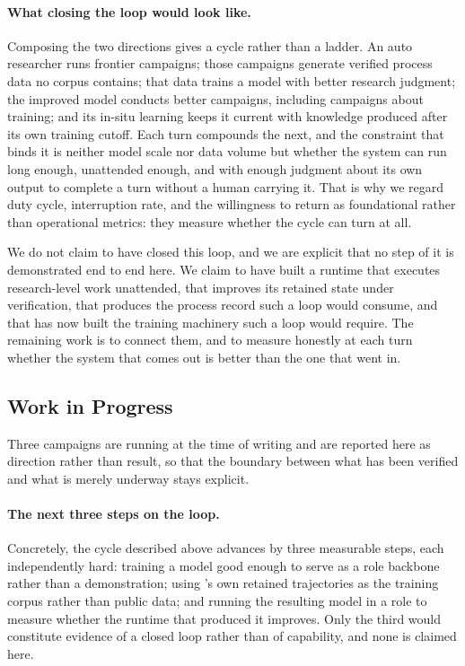 \paragraph{What closing the loop would look like.}
Composing the two directions gives a cycle rather than a ladder. An auto researcher
runs frontier campaigns; those campaigns generate verified process data no corpus
contains; that data trains a model with better research judgment; the improved model
conducts better campaigns, including campaigns about training; and its in-situ
learning keeps it current with knowledge produced after its own training cutoff. Each
turn compounds the next, and the constraint that binds it is neither model scale nor
data volume but whether the system can run long enough, unattended enough, and with
enough judgment about its own output to complete a turn without a human carrying it.
That is why we regard duty cycle, interruption rate, and the willingness to return
 as foundational rather than operational metrics: they measure whether
the cycle can turn at all.

We do not claim to have closed this loop, and we are explicit that no step of it is
demonstrated end to end here. We claim to have built a runtime that executes
research-level work unattended, that improves its retained state under verification,
that produces the process record such a loop would consume, and that has now built
the training machinery such a loop would require. The remaining work is to connect
them, and to measure honestly at each turn whether the system that comes out is
better than the one that went in.

\subsection{Work in Progress}

Three campaigns are running at the time of writing and are reported here as
direction rather than result, so that the boundary between what has been verified
and what is merely underway stays explicit.

\paragraph{The next three steps on the loop.}
Concretely, the cycle described above advances by three measurable steps, each
independently hard: training a model good enough to serve as a role backbone rather
than a demonstration; using \systemname{}'s own retained trajectories as the training
corpus rather than public data; and running the resulting model in a role to measure
whether the runtime that produced it improves. Only the third would constitute
evidence of a closed loop rather than of capability, and none is claimed here.


